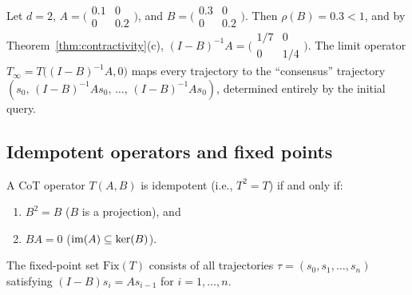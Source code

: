\begin{example}\label{ex:contractive}
  Let $d=2$, $A=\bigl(\begin{smallmatrix}0.1&0\\0&0.2\end{smallmatrix}\bigr)$,
  and $B=\bigl(\begin{smallmatrix}0.3&0\\0&0.2\end{smallmatrix}\bigr)$. Then
  $\rho(B)=0.3<1$, and by Theorem~\ref{thm:contractivity}(c),
  $(I-B)^{-1}A=\bigl(\begin{smallmatrix}1/7&0\\0&1/4\end{smallmatrix}\bigr)$.
  The limit operator $T_\infty=T\bigl((I-B)^{-1}A,0\bigr)$ maps every
  trajectory to the ``consensus'' trajectory
  $(s_0,\,(I-B)^{-1}As_0,\,\dots,\,(I-B)^{-1}As_0)$, determined entirely by
  the initial query.
\end{example}

\subsection{Idempotent operators and fixed points}

\begin{theorem}\label{thm:idempotent}
  A CoT operator $T(A,B)$ is idempotent (i.e., $T^2=T$) if and only if:
  \begin{enumerate}[label=\textup{(\roman*)}]
    \item $B^2=B$ \textup{(}$B$ is a projection\textup{)}, and
    \item $BA=0$ \textup{(}$\operatorname{im}(A)\subseteq\ker(B)$\textup{)}.
  \end{enumerate}
  The fixed-point set $\mathrm{Fix}(T)$ consists of all trajectories
  $\tau=(s_0,s_1,\dots,s_n)$ satisfying $(I-B)s_i=As_{i-1}$ for
  $i=1,\dots,n$.
\end{theorem}

